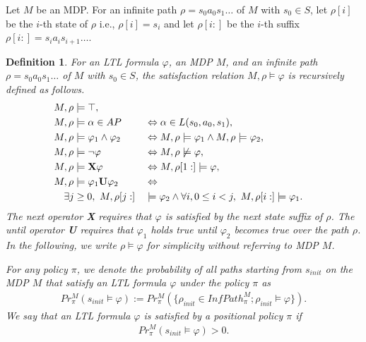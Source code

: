 \documentclass[letterpaper, 10 pt, conference]{ieeeconf}  %
\newtheorem{definition}{Definition}
\begin{document}
Let $ M $ be an MDP.
For an infinite path $\rho = s_0a_0s_1 \ldots $ of $ M $ with $ s_0 \in S $, let $\rho[i]$ be the $i$-th state of $\rho$ i.e., $\rho[i]=s_i$ and let $\rho[i:]$ be the $i$-th suffix $\rho[i:]=s_ia_is_{i+1} \ldots $.
\begin{definition}
	For an LTL formula $\varphi$, an MDP $M$, and an infinite path $\rho = s_0a_0s_1 \ldots$ of $ M $ with $ s_0 \in S $, the satisfaction relation $M,\rho \models \varphi$ is recursively defined as follows.
	\begin{alignat}{2}
	& M, \rho \models \top,\nonumber \\
	& M, \rho \models \alpha \in AP &&\Leftrightarrow \alpha \in L(s_0,a_0,s_1),\nonumber \\
	& M, \rho \models \varphi_1 \land \varphi_2 &&\Leftrightarrow M, \rho \models \varphi_1 \land M, \rho \models \varphi_2,\nonumber \\
	& M, \rho \models \neg \varphi &&\Leftrightarrow M, \rho \not\models \varphi,\nonumber \\
	& M, \rho \models \text{{\bf X}}\varphi &&\Leftrightarrow M, \rho[1:] \models \varphi,\nonumber \\
	& M, \rho \models \varphi_1 \text{{\bf U}} \varphi_2 &&\Leftrightarrow \nonumber \\
	& \quad \exists j \geq 0, \ M, \rho[j:] &&\models \varphi_2 \land \forall i, 0\leq i < j, \ M, \rho[i:] \models \varphi_1.\nonumber
	\end{alignat}
The next operator {\bf X} requires that $\varphi$ is satisfied by the next state suffix of $\rho$. The until operator {\bf U} requires that $\varphi_1$ holds true until $\varphi_2$ becomes true over the path $\rho$.
In the following, we write $ \rho \models \varphi $ for simplicity without referring to MDP $ M $.


For any policy $\pi$, we denote the probability of all paths starting from $s_{init}$ on the MDP $M$ that satisfy an LTL formula $\varphi$ under the policy $\pi$ as
\begin{align*}
Pr^{M}_{\pi}(s_{init} \! \models \varphi) := Pr^{M}_{\pi}(\{ \rho_{init} \! \in \! InfPath^{M}_{\pi} ; \rho_{init} \! \models \varphi \}).
\end{align*}
We say that an LTL formula $\varphi$ is satisfied by a positional policy $\pi$ if
\begin{align*}
Pr^{M}_{\pi}(s_{init} \models \varphi) > 0.
\end{align*}



\label{def5}
\end{definition}
\end{document}

